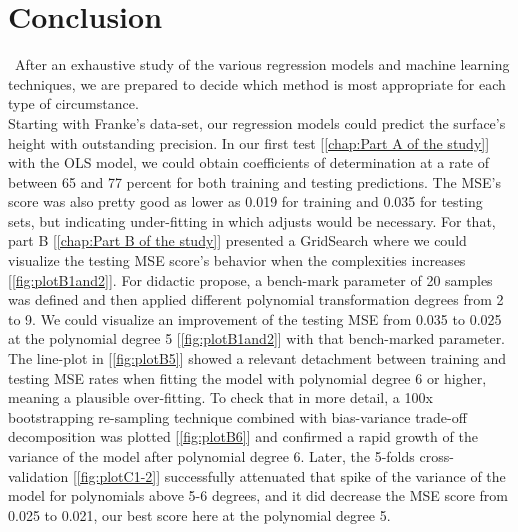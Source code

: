 \section{Conclusion}
\label{chap:Conclusion}

\quad \, After an exhaustive study of the various regression models and machine learning techniques, we are prepared to decide which method is most appropriate for each type of circumstance.\\ 

Starting with Franke's data-set, our regression models could predict the surface's height with outstanding precision. In our first test [\ref{chap:Part A of the study}] with the OLS model, we could obtain coefficients of determination at a rate of between 65 and 77 percent for both training and testing predictions. The MSE's score was also pretty good as lower as 0.019 for training and 0.035 for testing sets, but indicating under-fitting in which adjusts would be necessary. For that, part B [\ref{chap:Part B of the study}] presented a GridSearch where we could visualize the testing MSE score's behavior when the complexities increases [\ref{fig:plotB1and2}]. For didactic propose, a bench-mark parameter of 20 samples was defined and then applied different polynomial transformation degrees from 2 to 9. We could visualize an improvement of the testing MSE from 0.035 to 0.025 at the polynomial degree 5 [\ref{fig:plotB1and2}] with that bench-marked parameter. The line-plot in [\ref{fig:plotB5}] showed a relevant detachment between training and testing MSE rates when fitting the model with polynomial degree 6 or higher, meaning a plausible over-fitting. To check that in more detail, a 100x bootstrapping re-sampling technique combined with bias-variance trade-off decomposition was plotted [\ref{fig:plotB6}] and confirmed a rapid growth of the variance of the model after polynomial degree 6. Later, the 5-folds cross-validation [\ref{fig:plotC1-2}] successfully attenuated that spike of the variance of the model for polynomials above 5-6 degrees, and it did decrease the MSE score from 0.025 to 0.021, our best score here at the polynomial degree 5.\\

